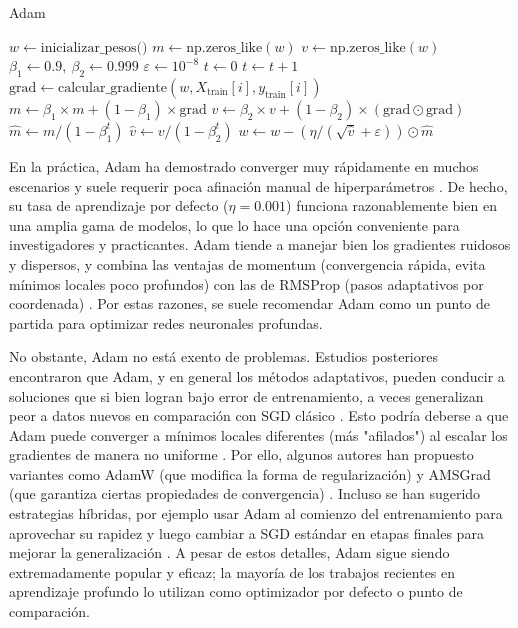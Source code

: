 \documentclass[12pt, spanish]{article}
\begin{document}
\begin{algorithm}[H]
\caption{Adam}
\begin{algorithmic}[1]
\State $w \gets \text{inicializar\_pesos()}$
\State $m \gets \text{np.zeros\_like}(w)$ 
\State $v \gets \text{np.zeros\_like}(w)$ 
\State $\beta_1 \gets 0.9,\ \beta_2 \gets 0.999$
\State $\varepsilon \gets 10^{-8}$
\State $t \gets 0$
        \State $t \gets t + 1$
        \State $\text{grad} \gets \text{calcular\_gradiente}(w, X_{\text{train}}[i], y_{\text{train}}[i])$
        \State $m \gets \beta_1 \times m + (1 - \beta_1) \times \text{grad}$
        \State $v \gets \beta_2 \times v + (1 - \beta_2) \times (\text{grad} \odot \text{grad})$
        \State $\hat{m} \gets m / (1 - \beta_1^t)$ 
        \State $\hat{v} \gets v / (1 - \beta_2^t)$
        \State $w \gets w - \left( \eta / (\sqrt{\hat{v}} + \varepsilon) \right) \odot \hat{m}$ 
    \EndFor
\EndFor
\end{algorithmic}
\end{algorithm}

En la práctica, Adam ha demostrado converger muy rápidamente en muchos escenarios y suele requerir poca afinación manual de hiperparámetros \cite{ref2}. De hecho, su tasa de aprendizaje por defecto ($\eta = 0.001$) funciona razonablemente bien en una amplia gama de modelos, lo que lo hace una opción conveniente para investigadores y practicantes. Adam tiende a manejar bien los gradientes ruidosos y dispersos, y combina las ventajas de momentum (convergencia rápida, evita mínimos locales poco profundos) con las de RMSProp (pasos adaptativos por coordenada) \cite{ref2}. Por estas razones, se suele recomendar Adam como un punto de partida para optimizar redes neuronales profundas.

No obstante, Adam no está exento de problemas. Estudios posteriores encontraron que Adam, y en general los métodos adaptativos, pueden conducir a soluciones que si bien logran bajo error de entrenamiento, a veces generalizan peor a datos nuevos en comparación con SGD clásico \cite{ref5}. Esto podría deberse a que Adam puede converger a mínimos locales diferentes (más "afilados") al escalar los gradientes de manera no uniforme \cite{ref5}. Por ello, algunos autores han propuesto variantes como AdamW (que modifica la forma de regularización) y AMSGrad (que garantiza ciertas propiedades de convergencia) \cite{ref2}. Incluso se han sugerido estrategias híbridas, por ejemplo usar Adam al comienzo del entrenamiento para aprovechar su rapidez y luego cambiar a SGD estándar en etapas finales para mejorar la generalización \cite{ref5}. A pesar de estos detalles, Adam sigue siendo extremadamente popular y eficaz; la mayoría de los trabajos recientes en aprendizaje profundo lo utilizan como optimizador por defecto o punto de comparación.
\end{document}
